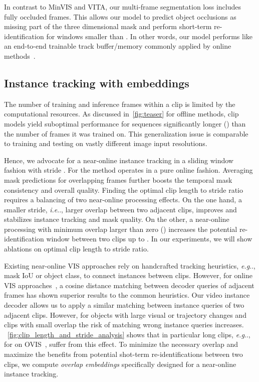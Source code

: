 \documentclass{article}
\makeatletter
\theoremstyle{plain}
\theoremstyle{definition}
\theoremstyle{remark}
\DeclareRobustCommand\onedot{\futurelet\@let@token\@onedot}
\def\@onedot{\ifx\@let@token.\else.\null\fi\xspace}
\def\eg{\emph{e.g}\onedot} \def\Eg{\emph{E.g}\onedot}
\def\ie{\emph{i.e}\onedot} \def\Ie{\emph{I.e}\onedot}
\makeatother
\begin{document}
In contrast to MinVIS and VITA, our multi-frame segmentation loss includes fully occluded frames.
This allows our model to predict object occlusions as missing part of the three dimensional mask and perform short-term re-identification for windows smaller than .
In other words, our model performs like an end-to-end trainable track buffer/memory commonly applied by online methods~\cite{Yang2019vis,sip_mask,sg_net,IDOL,VISOLO}.







\subsection{Instance tracking with embeddings}

The number of training and inference frames within a clip is limited by the computational resources.
As discussed in~\cref{fig:teaser} for offline methods, clip models yield suboptimal performance for sequences significantly longer () than the number of frames it was trained on.
This generalization issue is comparable to training and testing on vastly different image input resolutions.

Hence, we advocate for a near-online instance tracking in a sliding window fashion with stride .
For  the method operates in a pure online fashion.
Averaging mask predictions for overlapping frames further boosts the temporal mask consistency and overall quality.
Finding the optimal clip length  to stride  ratio requires a balancing of two near-online processing effects.
On the one hand, a smaller stride, \ie, larger overlap between two adjacent clips, improves and stabilizes instance tracking and mask quality.
On the other, a near-online processing with minimum overlap larger than zero () increases the potential re-identification window between two clips up to .
In our experiments, we will show ablations on optimal clip length to stride ratio.



Existing near-online VIS approaches rely on handcrafted tracking heuristics, \eg, mask IoU or object class, to connect instances between clips.
However, for online VIS approaches~\cite{huang2022minvis,IDOL}, a cosine distance matching between decoder queries of adjacent frames has shown superior results to the common heuristics.
Our video instance decoder allows us to apply a similar matching between instance queries of two adjacent clips.
However, for objects with large visual or trajectory changes and clips with small overlap the risk of matching wrong instance queries increases.
~\cref{fig:clip_length_and_stride_analysis} shows that in particular long clips, \eg, for  on OVIS~\cite{ovis}, suffer from this effect.
To minimize the necessary overlap and maximize the benefits from potential shot-term re-identifications between two clips, we compute \emph{overlap embeddings} specifically designed for a near-online instance tracking.
\end{document}

